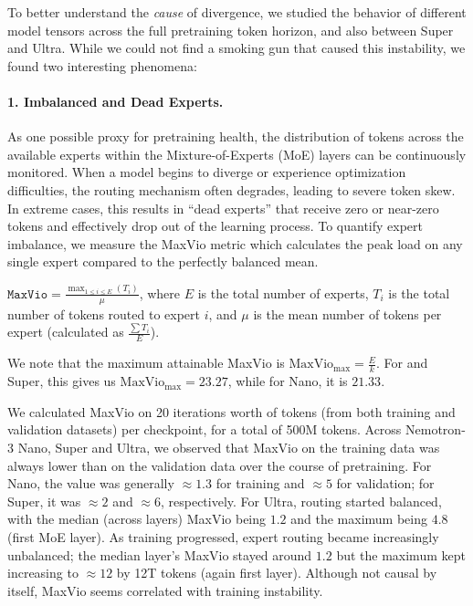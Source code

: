 To better understand the \emph{cause} of divergence, we studied the behavior of different model tensors across the full pretraining token horizon, and also between Super and Ultra. While we could not find a smoking gun that caused this instability, we found two interesting phenomena:

\paragraph{1. Imbalanced and Dead Experts.} As one possible proxy for pretraining health, the distribution of tokens across the available experts within the Mixture-of-Experts (MoE) layers can be continuously monitored. When a model begins to diverge or experience optimization difficulties, the routing mechanism often degrades, leading to severe token skew. In extreme cases, this results in ``dead experts'' that receive zero or near-zero tokens and effectively drop out of the learning process.
To quantify expert imbalance, we measure the MaxVio metric \citep{deepseekai2025deepseekv3technicalreport} which calculates the peak load on any single expert compared to the perfectly balanced mean. 

$\texttt{MaxVio} = \frac{\max_{1 \le i \le E} (T_i)}{\mu}$, where $E$ is the total number of experts, $T_i$ is the total number of tokens routed to expert $i$, and $\mu$ is the mean number of tokens per expert (calculated as $\frac{\sum T_i}{E}$).

We note that the maximum attainable MaxVio is $\text{MaxVio}_{\text{max}} = \frac{E}{k}$. For \ourmodel and Super, this gives us $\text{MaxVio}_{\text{max}} = 23.27$, while for Nano, it is $21.33$. 

We calculated MaxVio on 20 iterations worth of tokens (from both training and validation datasets) per checkpoint, for a total of 500M tokens. Across Nemotron-3 Nano, Super and Ultra, we observed that MaxVio on the training data was always lower than on the validation data over the course of pretraining. For Nano, the value was generally $\approx 1.3$ for training and $\approx 5$ for validation; for Super, it was $\approx 2$ and $\approx 6$, respectively. For Ultra, routing started balanced, with the median (across layers) MaxVio being $1.2$ and the maximum being $4.8$ (first MoE layer). As training progressed, expert routing became increasingly unbalanced; the median layer's MaxVio stayed around $1.2$ but the maximum kept increasing to $\approx 12$ by 12T tokens (again first layer). Although not causal by itself, MaxVio seems  correlated with training instability.

